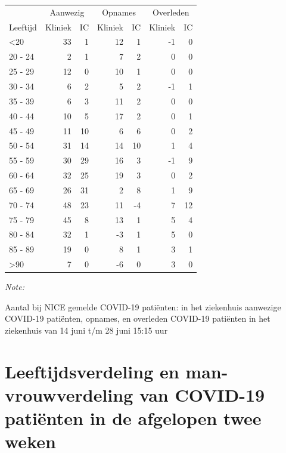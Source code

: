 \documentclass[
  english,
  man,floatsintext]{apa6}
\begin{document}
\begin{table}
\centering\begingroup\fontsize{10}{12}\selectfont

\begin{threeparttable}
\begin{tabular}{lrrrrrr}
\toprule
\multicolumn{1}{c}{ } & \multicolumn{2}{c}{Aanwezig} & \multicolumn{2}{c}{Opnames} & \multicolumn{2}{c}{Overleden} \\
\cmidrule(l{3pt}r{3pt}){2-3} \cmidrule(l{3pt}r{3pt}){4-5} \cmidrule(l{3pt}r{3pt}){6-7}
Leeftijd & Kliniek & IC & Kliniek & IC & Kliniek & IC\\
\midrule
<20 & 33 & 1 & 12 & 1 & -1 & 0\\
20 - 24 & 2 & 1 & 7 & 2 & 0 & 0\\
25 - 29 & 12 & 0 & 10 & 1 & 0 & 0\\
30 - 34 & 6 & 2 & 5 & 2 & -1 & 1\\
35 - 39 & 6 & 3 & 11 & 2 & 0 & 0\\
40 - 44 & 10 & 5 & 17 & 2 & 0 & 1\\
45 - 49 & 11 & 10 & 6 & 6 & 0 & 2\\
50 - 54 & 31 & 14 & 14 & 10 & 1 & 4\\
55 - 59 & 30 & 29 & 16 & 3 & -1 & 9\\
60 - 64 & 32 & 25 & 19 & 3 & 0 & 2\\
65 - 69 & 26 & 31 & 2 & 8 & 1 & 9\\
70 - 74 & 48 & 23 & 11 & -4 & 7 & 12\\
75 - 79 & 45 & 8 & 13 & 1 & 5 & 4\\
80 - 84 & 32 & 1 & -3 & 1 & 5 & 0\\
85 - 89 & 19 & 0 & 8 & 1 & 3 & 1\\
>90 & 7 & 0 & -6 & 0 & 3 & 0\\
\bottomrule
\end{tabular}
\begin{tablenotes}
\item \textit{Note: } 
\item Aantal bij NICE gemelde COVID-19 patiënten: in het ziekenhuis aanwezige COVID-19 patiënten, opnames, en overleden COVID-19 patiënten in het ziekenhuis van 14 juni t/m 28 juni 15:15 uur
\end{tablenotes}
\end{threeparttable}
\endgroup{}
\end{table}

\newpage

\hypertarget{leeftijdsverdeling-en-man-vrouwverdeling-van-covid-19-patiuxebnten-in-de-afgelopen-twee-weken}{%
\section{Leeftijdsverdeling en man-vrouwverdeling van COVID-19 patiënten in de afgelopen twee weken}\label{leeftijdsverdeling-en-man-vrouwverdeling-van-covid-19-patiuxebnten-in-de-afgelopen-twee-weken}}
\end{document}
